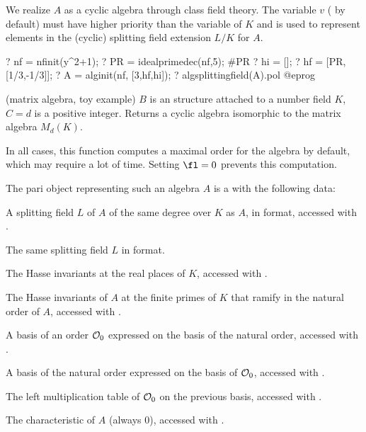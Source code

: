 We realize $A$ as a cyclic algebra through class field theory. The variable $v$
( by default) must have higher priority than the variable of
$K$ and is used to represent elements in the (cyclic) splitting
field extension $L/K$ for $A$.

\bprog
 ? nf = nfinit(y^2+1);
 ? PR = idealprimedec(nf,5); #PR
 ? hi = [];
 ? hf = [PR, [1/3,-1/3]];
 ? A = alginit(nf, [3,hf,hi]);
 ? algsplittingfield(A).pol
@eprog

\item (matrix algebra, toy example) $B$ is an  structure attached
to a number field $K$, $C = d$ is a positive integer. Returns a cyclic
algebra isomorphic to the matrix algebra $M_d(K)$.

In all cases, this function computes a maximal order for the algebra by default,
which may require a lot of time. Setting $\fl = 0$ prevents this computation.

The pari object representing such an algebra $A$ is a  with the
following data:

 \item A splitting field $L$ of $A$ of the same degree over $K$ as $A$, in
 format, accessed with .

 \item The same splitting field $L$ in  format.

 \item The Hasse invariants at the real places of $K$, accessed with
.

 \item The Hasse invariants of $A$ at the finite primes of $K$ that ramify in
the natural order of $A$, accessed with .

 \item A basis of an order ${\cal O}_0$ expressed on the basis of the natural
order, accessed with .

 \item A basis of the natural order expressed on the basis of ${\cal O}_0$,
accessed with .

 \item The left multiplication table of ${\cal O}_0$ on the previous basis,
accessed with .

 \item The characteristic of $A$ (always $0$), accessed with .

